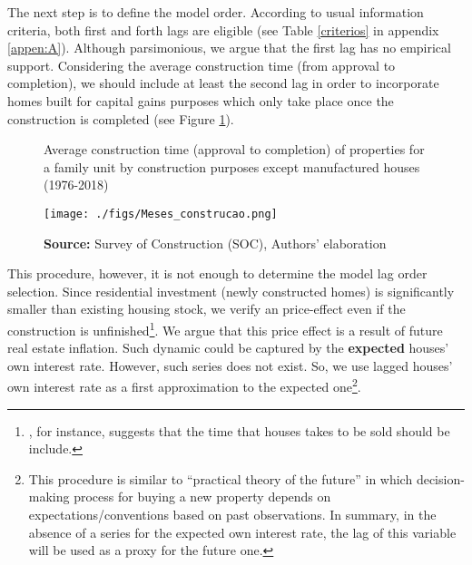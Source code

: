 \documentclass[12pt, a4paper]{article}
\begin{document}
The next step is to define the model order. According to usual information criteria, both first and forth lags are eligible (see Table \ref{criterios} in appendix \ref{appen:A}).
Although parsimonious, we argue that the first lag has no empirical support.
Considering the average construction time (from approval to completion), we should include at least the second lag in order to incorporate homes built for capital gains purposes which only take place once the construction is completed (see Figure \ref{meses}).

\begin{figure}[H]
	\centering
	\caption{Average construction time (approval to completion) of properties for a family unit by construction purposes except manufactured houses (1976-2018)}
    \label{meses}
	\texttt{[image: ./figs/Meses\_construcao.png]}
	\caption*{\textbf{Source:} Survey of Construction (SOC), Authors' elaboration}
\end{figure}

This procedure, however, it is not enough to determine the model lag order selection.
Since residential investment (newly constructed homes) is significantly smaller than existing housing stock, we verify an price-effect even if the construction is unfinished\footnote{\textcite{poterba_tax_1984}, for instance, suggests that the time that houses takes to be sold should be include.}.
We argue that this price effect is a result of future real estate inflation.
Such dynamic could be captured by the \textbf{expected} houses' own interest rate.
However, such series does not exist.
So, we use lagged houses' own interest rate as a first approximation to the expected one\footnote{This procedure is similar to \textcite{keynes_general_1937} ``practical theory of the future'' in which decision-making process for buying a new property depends on expectations/conventions based on past observations.
In summary, in the absence of a series for the expected own interest rate, the lag of this variable will be used as a proxy for the future one.}.
\end{document}
